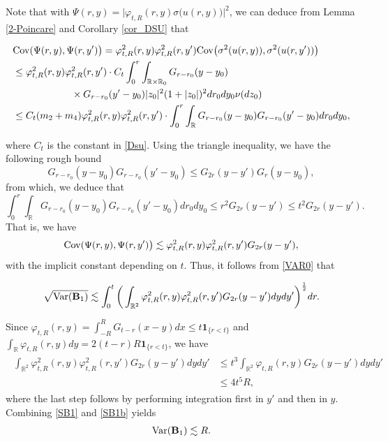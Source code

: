 \documentclass[letterpaper, 11pt,  reqno]{amsart}
\newcommand{\noi}{\noindent}
\newcommand{\R}{\mathbb{R}}
\newcommand{\s}{\sigma}
\newcommand{\les}{\lesssim}
\newcommand{\ind}{\mathbf 1}
\newcommand{\Var}{\textup{Var}}
\numberwithin{equation}{section}
\numberwithin{theorem}{section}
\begin{document}
\noi
Note that with $\Psi(r,y) =  \big|  \varphi_{t, R}(r,y)   \s\big( u(r, y) \big) \big|^2$,
we can deduce from Lemma \ref{2-Poincare} and Corollary \ref{cor_DSU}
that 

\noi
\begin{align}\label{use_DSU}
\begin{aligned}
&{\rm Cov}( \Psi(r,y),  \Psi(r,y')    \big) 
= \varphi^2_{t, R}(r,y) \varphi^2_{t, R}(r,y')  {\rm Cov} \big(  \s^2(u(r, y)),  \s^2(u(r, y'))   \big) \\
&\leq   \varphi^2_{t, R}(r,y) \varphi^2_{t, R}(r,y')  \cdot
C_t \int_0^r \int_{\R\times\R_0} G_{r-r_0}(y-y_0)  \\
&\qquad\qquad\qquad \times G_{r-r_0}(y'-y_0)  |z_0|^2 (1+ |z_0|)^2 dr_0 dy_0 \nu(dz_0)\\
&\leq C_t (m_2 + m_4)
\varphi^2_{t, R}(r,y) \varphi^2_{t, R}(r,y')  \cdot
\int_0^r \int_{\R} G_{r-r_0}(y-y_0) G_{r-r_0}(y'-y_0)   dr_0 dy_0,
\end{aligned}
\end{align}

\noi
where $C_t$ is the constant  in \eqref{Dsu}. Using the triangle inequality,
we have the following rough bound
\[
G_{r-r_0}(y-y_0) G_{r-r_0}(y'-y_0) \leq G_{2r}(y-y') G_r(y-y_0), 
\]
from which, we deduce that 
\[
\int_0^r \int_{\R} G_{r-r_0}(y-y_0) G_{r-r_0}(y'-y_0)   dr_0 dy_0
\leq r^2 G_{2r}(y-y') \leq t^2 G_{2r}(y-y').
\]
That is, we have 
\[
{\rm Cov}( \Psi(r,y),  \Psi(r,y')    \big) \les 
\varphi^2_{t, R}(r,y) \varphi^2_{t, R}(r,y') G_{2r}(y-y'),
\]
with the implicit constant depending on $t$. Thus, it follows from 
\eqref{VAR0}    that 

\noi
\begin{align}\label{SB1}
\sqrt{ \Var(  \mathbf{B}_1) }
\les 
  \int_{0}^t   \bigg(  \int_{\R^2} \varphi^2_{t, R}(r,y) \varphi^2_{t, R}(r,y') G_{2r}(y-y')
   dy dy' \bigg)^{\frac12} dr.
\end{align}

\noi
Since $\varphi_{t,R}(r,y) = \int_{-R}^R G_{t-r}(x-y)dx \leq t \ind_{\{r < t\}}$
and  $\int_{\R} \varphi_{t,R}(r,y) dy = 2(t-r)R \ind_{\{r < t\}}$,
we have 
\begin{align}\label{SB1b}
\begin{aligned}
 \int_{\R^2} \varphi^2_{t, R}(r,y) \varphi^2_{t, R}(r,y') G_{2r}(y-y')
   dy dy'
  &\leq t^3  \int_{\R^2} \varphi_{t, R}(r,y)  G_{2r}(y-y')
   dy dy' \\
  & \leq 4 t^5 R,
   \end{aligned}   
   \end{align}
where the last step follows by performing integration first in $y'$ and then in $y$.
Combining \eqref{SB1} and \eqref{SB1b} yields
\begin{align} \label{SB1c}
  \Var(  \mathbf{B}_1)  \les  R.
\end{align}
\end{document}
